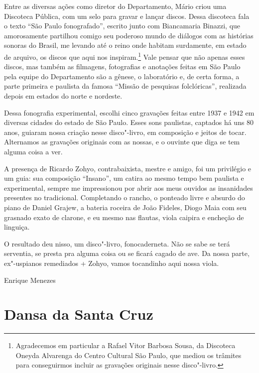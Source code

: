 Entre as diversas ações como diretor do Departamento, Mário criou uma
Discoteca Pública, com um selo para gravar e lançar discos. Dessa
discoteca fala o texto ``São Paulo fonografado'', escrito junto com
Biancamaria Binazzi, que amorosamente partilhou comigo seu poderoso
mundo de diálogos com as histórias sonoras do Brasil, me levando até o
reino onde habitam surdamente, em estado de arquivo, os discos que aqui
nos inspiram.\footnote{Agradecemos em particular a Rafael Vitor Barbosa
  Sousa, da Discoteca Oneyda Alvarenga do Centro Cultural São Paulo, que
  mediou os trâmites para conseguirmos incluir as gravações originais
  nesse disco"-livro.} Vale pensar que não apenas esses discos, mas também as
filmagens, fotografias e anotações feitas em São Paulo pela equipe do
Departamento são a gênese, o laboratório e, de certa forma, a parte
primeira e paulista da famosa ``Missão de pesquisas folclóricas'',
realizada depois em estados do norte e nordeste.

Dessa fonografia experimental, escolhi cinco gravações feitas entre 1937
e 1942 em diversas cidades do estado de São Paulo. Esses sons paulistas,
captados há uns 80 anos, guiaram nossa criação nesse disco"-livro, em
composição e jeitos de tocar. Alternamos as gravações originais com as
nossas, e o ouvinte que diga se tem alguma coisa a ver.

A presença de Ricardo Zohyo, contrabaixista, mestre e amigo, foi um
privilégio e um guia: sua composição ``Insano'', um catira ao mesmo
tempo bem paulista e experimental, sempre me impressionou por abrir aos
meus ouvidos as insanidades presentes no tradicional. Completando o
rancho, o ponteado livre e absurdo do piano de Daniel Grajew, a bateria
roceira de João Fideles, Diogo Maia com seu grasnado exato de clarone, e
eu mesmo nas flautas, viola caipira e encheção de linguiça.

O resultado deu nisso, um disco"-livro, fonocaderneta. Não se sabe se
terá serventia, se presta pra alguma coisa ou se ficará cagado de ave.
Da nossa parte, ex"-uspianos remediados + Zohyo, vamos tocandinho aqui
nossa viola.

\begin{flushright}
\vfill
Enrique Menezes
\end{flushright}

\chapter*{Dansa da Santa Cruz}


